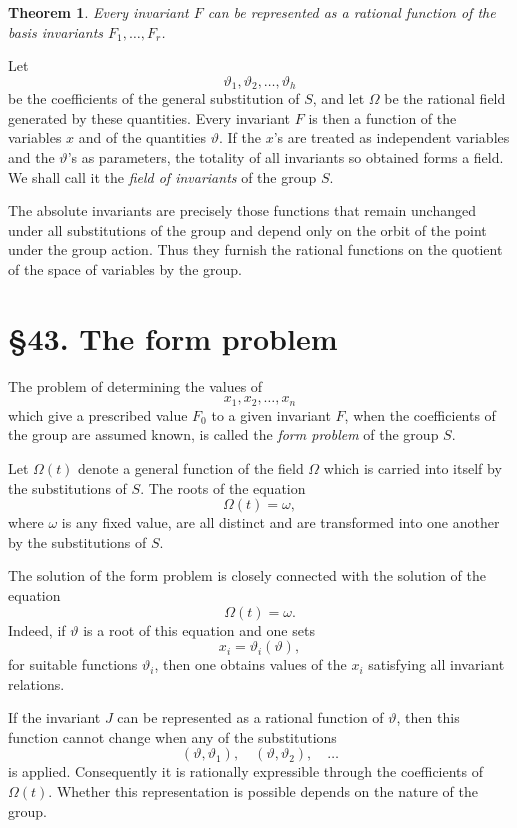 \documentclass[11pt,a4paper]{book}
\newcommand{\webersection}[2]{\clearpage\section*{\S #1. #2}}
\newtheorem*{satz}{Theorem}
\begin{document}
\begin{satz}
Every invariant \(F\) can be represented as a rational function of the basis invariants \(F_1,\ldots,F_r\).
\end{satz}

Let
\[
\vartheta_1,\vartheta_2,\ldots,\vartheta_h
\]
be the coefficients of the general substitution of \(S\), and let \(\Omega\) be the rational field generated by these quantities.  Every invariant \(F\) is then a function of the variables \(x\) and of the quantities \(\vartheta\).  If the \(x\)'s are treated as independent variables and the \(\vartheta\)'s as parameters, the totality of all invariants so obtained forms a field.  We shall call it the \emph{field of invariants} of the group \(S\).

The absolute invariants are precisely those functions that remain unchanged under all substitutions of the group and depend only on the orbit of the point under the group action.  Thus they furnish the rational functions on the quotient of the space of variables by the group.

\webersection{43}{The form problem}

The problem of determining the values of
\[
x_1,x_2,\ldots,x_n
\]
which give a prescribed value \(F_0\) to a given invariant \(F\), when the coefficients of the group are assumed known, is called the \emph{form problem} of the group \(S\).

Let \(\Omega(t)\) denote a general function of the field \(\Omega\) which is carried into itself by the substitutions of \(S\).  The roots of the equation
\[
\Omega(t)=\omega,
\]
where \(\omega\) is any fixed value, are all distinct and are transformed into one another by the substitutions of \(S\).

The solution of the form problem is closely connected with the solution of the equation
\[
\Omega(t)=\omega.
\]
Indeed, if \(\vartheta\) is a root of this equation and one sets
\begin{equation}
x_i=\vartheta_i(\vartheta),
\end{equation}
for suitable functions \(\vartheta_i\), then one obtains values of the \(x_i\) satisfying all invariant relations.

If the invariant \(J\) can be represented as a rational function of \(\vartheta\), then this function cannot change when any of the substitutions
\[
(\vartheta,\vartheta_1),\quad
(\vartheta,\vartheta_2),\quad\ldots
\]
is applied.  Consequently it is rationally expressible through the coefficients of \(\Omega(t)\).  Whether this representation is possible depends on the nature of the group.
\end{document}
